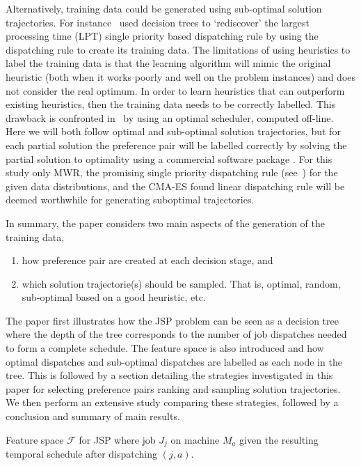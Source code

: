 \documentclass{svjour3}                     %
\begin{document}
Alternatively, training data could be generated using sub-optimal solution trajectories. For instance~\cite{Siggi05} used decision trees to `rediscover' the largest processing time (LPT) single priority based dispatching rule by 
using the dispatching rule to create its training data. The limitations of using heuristics to label the training data is that the learning algorithm will mimic the original heuristic (both when it works poorly and well on the problem instances) and does not consider the real optimum. In order to learn heuristics that can outperform existing heuristics, then the training data needs to be correctly labelled. This drawback is confronted in~\cite{Malik08,Russell09,Siggi10} by using an optimal scheduler, computed off-line. Here we will both follow optimal and sub-optimal solution trajectories, but for each partial solution the preference pair will be labelled correctly by solving the partial solution to optimality using a commercial software package \cite{gurobi}. For this study only MWR, the promising single priority dispatching rule (see~\cite{InRu12a}) for the given data distributions, and the CMA-ES found linear dispatching rule will be deemed worthwhile for generating suboptimal trajectories.

In summary, the paper considers two main aspects of the generation of the training data, 
\begin{enumerate}
\item how preference pair are created at each decision stage, and
\item which solution trajectorie(s) should be sampled. That is, optimal, random, sub-optimal based on a good 
heuristic, etc.
\end{enumerate}

The paper first illustrates how the JSP problem can be seen as a decision tree where the depth of the tree corresponds 
to the number of job dispatches needed to form a complete schedule. The feature space is also introduced and how 
optimal dispatches and sub-optimal dispatches are labelled as each node in the tree. This is followed by a section 
detailing the strategies investigated in this paper for selecting preference pairs ranking and sampling solution 
trajectories. We then perform an extensive study comparing these strategies, followed by a conclusion and summary of 
main results.

\begin{table}  
  \caption{Feature space $\mathcal{F}$ for JSP where job $J_j$ on machine $M_a$ given the resulting temporal schedule after dispatching $(j,a)$.  }
  \label{tbl:jssp:feat}
  
\end{table}
\end{document}
